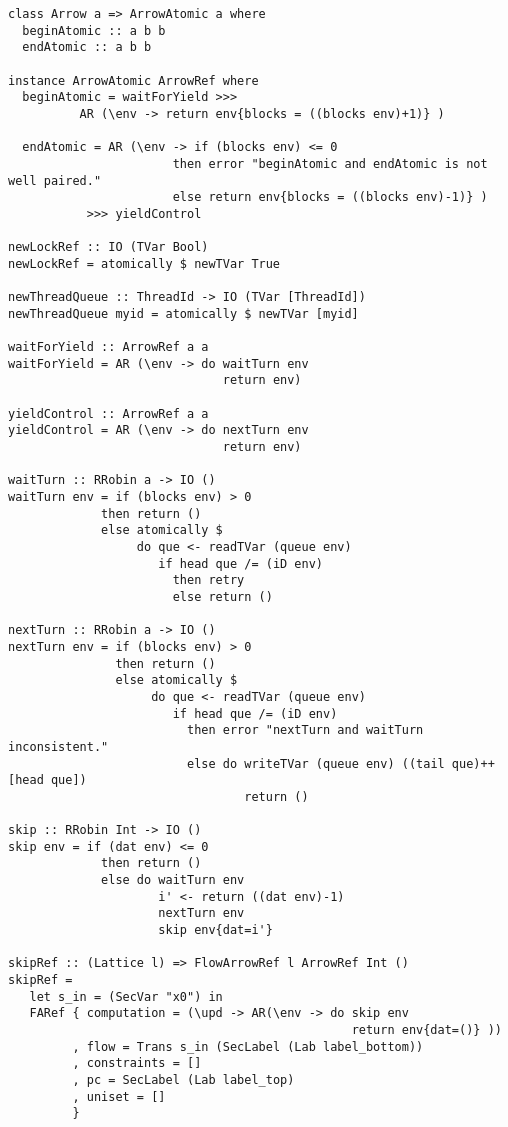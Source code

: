 \begin{Verbatim}[fontsize=\footnotesize,frame=lines,
                 framesep=5mm, label={[FlowArrowRef.hs]FlowArrowRef.hs}]
class Arrow a => ArrowAtomic a where
  beginAtomic :: a b b
  endAtomic :: a b b

instance ArrowAtomic ArrowRef where
  beginAtomic = waitForYield >>>
          AR (\env -> return env{blocks = ((blocks env)+1)} )

  endAtomic = AR (\env -> if (blocks env) <= 0 
                       then error "beginAtomic and endAtomic is not well paired."
                       else return env{blocks = ((blocks env)-1)} )
           >>> yieldControl

newLockRef :: IO (TVar Bool)
newLockRef = atomically $ newTVar True

newThreadQueue :: ThreadId -> IO (TVar [ThreadId])
newThreadQueue myid = atomically $ newTVar [myid]

waitForYield :: ArrowRef a a
waitForYield = AR (\env -> do waitTurn env
                              return env)

yieldControl :: ArrowRef a a
yieldControl = AR (\env -> do nextTurn env
                              return env)

waitTurn :: RRobin a -> IO ()
waitTurn env = if (blocks env) > 0
             then return ()
             else atomically $
                  do que <- readTVar (queue env)
                     if head que /= (iD env)
                       then retry
                       else return ()

nextTurn :: RRobin a -> IO ()
nextTurn env = if (blocks env) > 0
               then return ()
               else atomically $
                    do que <- readTVar (queue env)
                       if head que /= (iD env)
                         then error "nextTurn and waitTurn inconsistent."
                         else do writeTVar (queue env) ((tail que)++[head que])
                                 return ()

skip :: RRobin Int -> IO ()
skip env = if (dat env) <= 0
             then return ()
             else do waitTurn env
                     i' <- return ((dat env)-1)
                     nextTurn env
                     skip env{dat=i'}

skipRef :: (Lattice l) => FlowArrowRef l ArrowRef Int ()
skipRef =
   let s_in = (SecVar "x0") in
   FARef { computation = (\upd -> AR(\env -> do skip env
                                                return env{dat=()} ))
         , flow = Trans s_in (SecLabel (Lab label_bottom))
         , constraints = []
         , pc = SecLabel (Lab label_top)
         , uniset = []
         }


\end{Verbatim}
